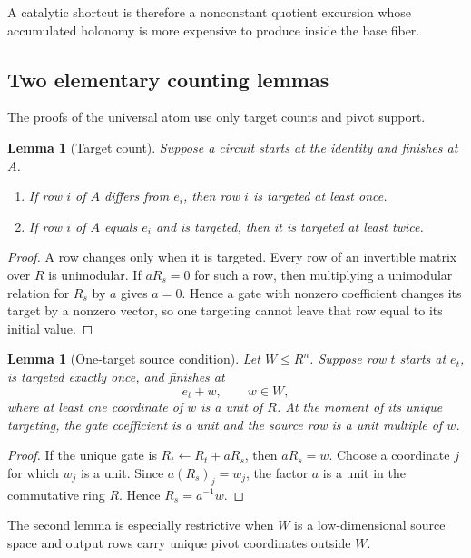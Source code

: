 \documentclass[11pt]{amsart}
\numberwithin{equation}{section}
\newtheorem{lemma}[theorem]{Lemma}
\theoremstyle{definition}
\theoremstyle{remark}
\begin{document}
A catalytic shortcut is therefore a nonconstant quotient excursion whose accumulated holonomy is more expensive to produce inside the base fiber.

\subsection{Two elementary counting lemmas}

The proofs of the universal atom use only target counts and pivot support.

\begin{lemma}[Target count]\label{lem:target-count}
Suppose a circuit starts at the identity and finishes at $A$.
\begin{enumerate}[label=\textup{(\roman*)}]
\item If row $i$ of $A$ differs from $e_i$, then row $i$ is targeted at least once.
\item If row $i$ of $A$ equals $e_i$ and is targeted, then it is targeted at least twice.
\end{enumerate}
\end{lemma}

\begin{proof}
A row changes only when it is targeted.  Every row of an invertible matrix over $R$ is unimodular.  If $aR_s=0$ for such a row, then multiplying a unimodular relation for $R_s$ by $a$ gives $a=0$.  Hence a gate with nonzero coefficient changes its target by a nonzero vector, so one targeting cannot leave that row equal to its initial value.
\end{proof}

\begin{lemma}[One-target source condition]\label{lem:one-target-source}
Let $W\le R^n$.  Suppose row $t$ starts at $e_t$, is targeted exactly once, and finishes at
\[
e_t+w,
\qquad w\in W,
\]
where at least one coordinate of $w$ is a unit of $R$.  At the moment of its unique targeting, the gate coefficient is a unit and the source row is a unit multiple of $w$.
\end{lemma}

\begin{proof}
If the unique gate is $R_t\leftarrow R_t+aR_s$, then $aR_s=w$.  Choose a coordinate $j$ for which $w_j$ is a unit.  Since $a(R_s)_j=w_j$, the factor $a$ is a unit in the commutative ring $R$.  Hence $R_s=a^{-1}w$.
\end{proof}

The second lemma is especially restrictive when $W$ is a low-dimensional source space and output rows carry unique pivot coordinates outside $W$.
\end{document}
